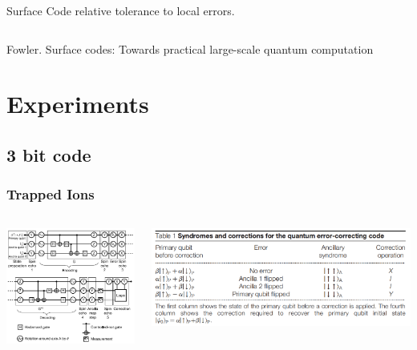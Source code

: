 \documentclass[aspectratio=169,10pt]{beamer}
\begin{document}
\begin{frame}
\begin{columns}
\begin{column}{0.6\textwidth}
\begin{block}{Surface Code}
            relative tolerance to local errors.
        \end{block}
        \end{column}
    \end{columns}
\tiny{Fowler. Surface codes: Towards practical large-scale quantum computation}
\end{frame}
\section{Experiments}
\subsection{3 bit code}
\begin{frame}
    \frametitle{Trapped Ions}
    \begin{columns}
        \begin{column}{0.45\textwidth}
            \centering
            \includegraphics[width=\columnwidth]{figure/qec.png}
        \end{column}
        \begin{column}{0.55\textwidth}
            \centering
            \includegraphics[width=\columnwidth]{figure/qec11.png}

\end{column}
\end{columns}
\end{frame}
\end{document}

